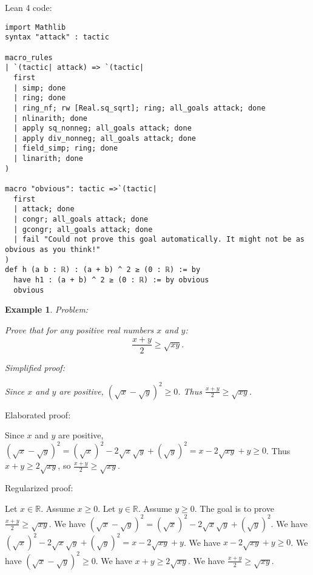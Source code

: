 \documentclass{article}
\newtheorem{example}{Example}
\begin{document}
Lean 4 code:
\begin{tcolorbox}[colback=white!10, width=\linewidth]
\begin{lstlisting}[language=Lean4]
import Mathlib
syntax "attack" : tactic

macro_rules
| `(tactic| attack) => `(tactic|
  first
  | simp; done
  | ring; done
  | ring_nf; rw [Real.sq_sqrt]; ring; all_goals attack; done
  | nlinarith; done
  | apply sq_nonneg; all_goals attack; done
  | apply div_nonneg; all_goals attack; done
  | field_simp; ring; done
  | linarith; done
)

macro "obvious": tactic =>`(tactic|
  first
  | attack; done
  | congr; all_goals attack; done
  | gcongr; all_goals attack; done
  | fail "Could not prove this goal automatically. It might not be as obvious as you think!"
)
def h (a b : ℝ) : (a + b) ^ 2 ≥ (0 : ℝ) := by
  have h1 : (a + b) ^ 2 ≥ (0 : ℝ) := by obvious
  obvious

\end{lstlisting}
\end{tcolorbox}


\begin{example}
Problem:
\begin{tcolorbox}[colback=yellow!10, width=\linewidth]
Prove that for any positive real numbers $x$ and $y$:
    $$\frac{x+y}{2} \geq \sqrt{xy}.$$
\end{tcolorbox}

Simplified proof:
\begin{tcolorbox}[colback=blue!10, width=\linewidth]
Since $x$ and $y$ are positive, $(\sqrt x - \sqrt y)^2 \ge 0$. Thus $\frac{x+y}{2} \ge \sqrt{xy}$.
\end{tcolorbox}
\end{example}

Elaborated proof:
\begin{tcolorbox}[colback=green!10, width=\linewidth]
Since $x$ and $y$ are positive, $(\sqrt x - \sqrt y)^2 = (\sqrt x)^2 - 2\sqrt x \sqrt y + (\sqrt y)^2 = x - 2\sqrt{xy} + y \ge 0$. Thus $x + y \ge 2\sqrt{xy}$, so $\frac{x+y}{2} \ge \sqrt{xy}$.
\end{tcolorbox}

Regularized proof:
\begin{tcolorbox}[colback=red!10, width=\linewidth]
Let $x\in\mathbb{R}$. Assume $x\ge 0$.
Let $y\in\mathbb{R}$. Assume $y\ge 0$.
The goal is to prove $\frac{x+y}{2} \ge \sqrt{xy}$.
We have ${{(\sqrt x - \sqrt y)}}^2 = {{(\sqrt x)}}^2 - 2\sqrt x \sqrt y + {{(\sqrt y)}}^2$.
We have ${{(\sqrt x)}}^2 - 2\sqrt x \sqrt y + {{(\sqrt y)}}^2 = x - 2\sqrt{xy} + y$.
We have $x - 2\sqrt{xy} + y \ge 0$.
We have ${{(\sqrt x - \sqrt y)}}^2 \ge 0$.
We have $x + y \ge 2\sqrt{xy}$.
We have $\frac{x+y}{2} \ge \sqrt{xy}$.
\end{tcolorbox}
\end{document}
